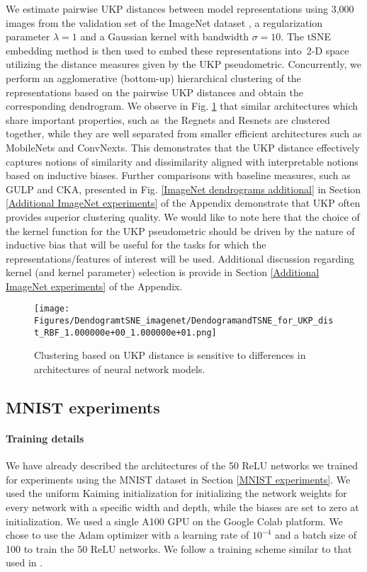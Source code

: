 \documentclass{article} %
\newcommand{\metricstname}{UKP }
\theoremstyle{plain}
\begin{document}
 We estimate pairwise \metricstname distances between model representations using 3,000 images from the validation set of the ImageNet dataset \citep{krizhevsky2012imagenet}, a regularization parameter $\lambda=1$ and a Gaussian kernel with bandwidth $\sigma=10$. The tSNE embedding method is then used to embed these representations into 2-D space utilizing the distance measures given by the \metricstname pseudometric. Concurrently, we perform an agglomerative (bottom-up) hierarchical clustering of the representations based on the pairwise \metricstname distances and obtain the corresponding dendrogram. We observe in Fig. \ref{DendrogramandtSNE} that similar architectures which share important properties, such as the Regnets and Resnets are clustered together, while they are well separated from smaller efficient architectures such as MobileNets and ConvNexts. This demonstrates that the \metricstname distance effectively captures notions of similarity and dissimilarity aligned with interpretable notions based on inductive biases. Further comparisons with baseline measures, such as GULP and CKA, presented in Fig. \ref{ImageNet dendrograms additional} in Section \ref{Additional ImageNet experiments} of the Appendix demonstrate that \metricstname often provides superior clustering quality. We would like to note here that the choice of the kernel function for the \metricstname pseudometric should be driven by the nature of inductive bias that will be useful for the tasks for which the representations/features of interest will be used. Additional discussion regarding kernel (and kernel parameter) selection is provide in Section \ref{Additional ImageNet experiments} of the Appendix.
 \begin{figure}[t]
\begin{center}
\texttt{[image: Figures/DendogramtSNE\_imagenet/DendogramandTSNE\_for\_UKP\_dist\_RBF\_1.000000e+00\_1.000000e+01.png]}
\caption{Clustering based on \metricstname distance is sensitive to differences in architectures of neural network models.}\label{DendrogramandtSNE}
\end{center}
\vspace{-4mm}
\end{figure}
\subsection{MNIST experiments}
\label{MNIST Experiments additional}

\paragraph{Training details} We have already described the architectures of the 50 ReLU networks we trained for experiments using the MNIST dataset in Section \ref{MNIST experiments}. We used the uniform Kaiming initialization \cite{he2015delving} for initializing the network weights for every network with a specific width and depth, while the biases are set to zero at initialization. We used a single A100 GPU on the Google Colab platform. We chose to use the Adam optimizer with a learning rate of $10^{-4}$ and a batch size of 100 to train the 50 ReLU networks. We follow a training scheme similar to that used in \citet{GULP}.
\end{document}
